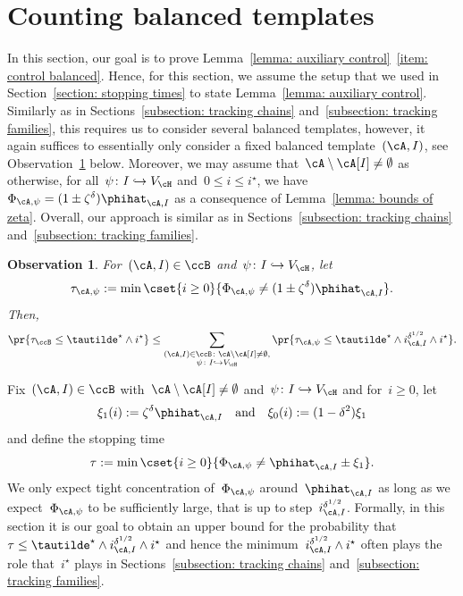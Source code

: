 \documentclass[11pt]{amsart}
\newcommand{\qtand}{\quad\text{and}\quad}
\newcommand{\injection}{\hookrightarrow}
\newtheorem{observation}[algocf]{Observation}
\theoremstyle{definition}
\numberwithin{equation}{section}
\begin{document}
	\section{Counting balanced templates}\label{appendix: balanced}
	In this section, our goal is to prove Lemma~\ref{lemma: auxiliary control}~\ref{item: control balanced}.
	Hence, for this section, we assume the setup that we used in Section~\ref{section: stopping times} to state Lemma~\ref{lemma: auxiliary control}.
	Similarly as in Sections~\ref{subsection: tracking chains} and~\ref{subsection: tracking families}, this requires us to consider several balanced templates, however, it again suffices to essentially only consider a fixed balanced template~$(\cA,I)$, see Observation~\ref{observation: balanced individual} below.
	Moreover, we may assume that~$\cA\setminus\cA[I]\neq\emptyset$ as otherwise, for all~$\psi\colon I\injection V_\cH$ and~$0\leq i\leq i^\star$, we have~$\Phi_{\cA,\psi}=(1\pm\zeta^\delta)\phihat_{\cA,I}$ as a consequence of Lemma~\ref{lemma: bounds of zeta}.
	Overall, our approach is similar as in Sections~\ref{subsection: tracking chains} and~\ref{subsection: tracking families}.
	
	\begin{observation}\label{observation: balanced individual}
		For~$(\cA,I)\in\ccB$ and~$\psi\colon I\injection V_\cH$, let
		\begin{equation*}
			\tau_{\cA,\psi}:=\min\cset{i\geq 0}{ \Phi_{\cA,\psi}\neq (1\pm\zeta^\delta)\phihat_{\cA,I} }.
		\end{equation*}
		Then,
		\begin{equation*}
			\pr{\tau_{\ccB}\leq \tautilde^\star \wedge i^\star}\leq \sum_{\substack{(\cA,I)\in\ccB\colon \cA\setminus\cA[I]\neq\emptyset,\\ \psi\colon I\injection V_\cH}} \pr{ \tau_{\cA,\psi}\leq \tautilde^\star \wedge i^{\delta^{1/2}}_{\cA,I}\wedge i^\star }.
		\end{equation*}
	\end{observation}
	
	Fix~$(\cA,I)\in\ccB$ with~$\cA\setminus\cA[I]\neq\emptyset$ and~$\psi\colon I\injection V_\cH$ and for~$i\geq 0$, let
	\begin{equation*}
		\xi_1(i):=\zeta^\delta\phihat_{\cA,I}\qtand
		\xi_0(i):=(1-\delta^2)\xi_1
	\end{equation*}
	and define the stopping time
	\begin{equation*}
		\tau:=\min\cset{i\geq 0}{ \Phi_{\cA,\psi}\neq \phihat_{\cA,I}\pm\xi_1 }.
	\end{equation*}
	We only expect tight concentration of~$\Phi_{\cA,\psi}$ around~$\phihat_{\cA,I}$ as long as we expect~$\Phi_{\cA,\psi}$ to be sufficiently large, that is up to step~$i_{\cA,I}^{\delta^{1/2}}$.
	Formally, in this section it is our goal to obtain an upper bound for the probability that~$\tau\leq \tautilde^\star\wedge i_{\cA,I}^{\delta^{1/2}}\wedge i^\star$ and hence the minimum~$i_{\cA,I}^{\delta^{1/2}}\wedge i^\star$ often plays the role that~$i^\star$ plays in Sections~\ref{subsection: tracking chains} and~\ref{subsection: tracking families}.
	
\end{document}
